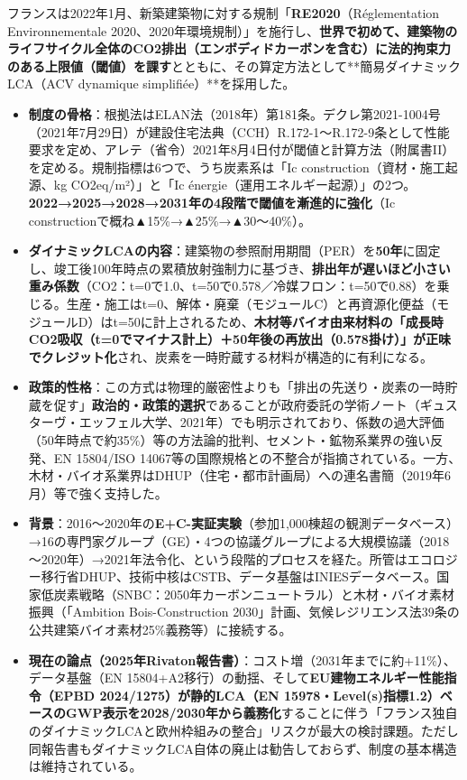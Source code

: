 \documentclass[11pt]{ltjsarticle}
\providecommand{\tightlist}{\setlength{\itemsep}{0pt}\setlength{\parskip}{0pt}}
\begin{document}
フランスは2022年1月、新築建築物に対する規制「\textbf{RE2020}（Réglementation
Environnementale
2020、2020年環境規制）」を施行し、\textbf{世界で初めて、建築物のライフサイクル全体のCO2排出（エンボディドカーボンを含む）に法的拘束力のある上限値（閾値）を課す}とともに、その算定方法として**簡易ダイナミックLCA（ACV
dynamique simplifiée）**を採用した。

\begin{itemize}
\tightlist
\item
  \textbf{制度の骨格}：根拠法はELAN法（2018年）第181条。デクレ第2021-1004号（2021年7月29日）が建設住宅法典（CCH）R.172-1～R.172-9条として性能要求を定め、アレテ（省令）2021年8月4日付が閾値と計算方法（附属書II）を定める。規制指標は6つで、うち炭素系は「Ic
  construction（資材・施工起源、kg CO2eq/m²）」と「Ic
  énergie（運用エネルギー起源）」の2つ。\textbf{2022→2025→2028→2031年の4段階で閾値を漸進的に強化}（Ic
  constructionで概ね▲15\%→▲25\%→▲30～40\%）。
\item
  \textbf{ダイナミックLCAの内容}：建築物の参照耐用期間（PER）を\textbf{50年}に固定し、竣工後100年時点の累積放射強制力に基づき、\textbf{排出年が遅いほど小さい重み係数}（CO2：t=0で1.0、t=50で0.578／冷媒フロン：t=50で0.88）を乗じる。生産・施工はt=0、解体・廃棄（モジュールC）と再資源化便益（モジュールD）はt=50に計上されるため、\textbf{木材等バイオ由来材料の「成長時CO2吸収（t=0でマイナス計上）＋50年後の再放出（0.578掛け）」が正味でクレジット化}され、炭素を一時貯蔵する材料が構造的に有利になる。
\item
  \textbf{政策的性格}：この方式は物理的厳密性よりも「排出の先送り・炭素の一時貯蔵を促す」\textbf{政治的・政策的選択}であることが政府委託の学術ノート（ギュスターヴ・エッフェル大学、2021年）でも明示されており、係数の過大評価（50年時点で約35\%）等の方法論的批判、セメント・鉱物系業界の強い反発、EN
  15804/ISO
  14067等の国際規格との不整合が指摘されている。一方、木材・バイオ系業界はDHUP（住宅・都市計画局）への連名書簡（2019年6月）等で強く支持した。
\item
  \textbf{背景}：2016～2020年の\textbf{E+C-実証実験}（参加1,000棟超の観測データベース）→16の専門家グループ（GE）・4つの協議グループによる大規模協議（2018～2020年）→2021年法令化、という段階的プロセスを経た。所管はエコロジー移行省DHUP、技術中核はCSTB、データ基盤はINIESデータベース。国家低炭素戦略（SNBC：2050年カーボンニュートラル）と木材・バイオ素材振興（「Ambition
  Bois-Construction
  2030」計画、気候レジリエンス法39条の公共建築バイオ素材25\%義務等）に接続する。
\item
  \textbf{現在の論点（2025年Rivaton報告書）}：コスト増（2031年までに約+11\%）、データ基盤（EN
  15804+A2移行）の動揺、そして\textbf{EU建物エネルギー性能指令（EPBD
  2024/1275）が静的LCA（EN
  15978・Level(s)指標1.2）ベースのGWP表示を2028/2030年から義務化}することに伴う「フランス独自のダイナミックLCAと欧州枠組みの整合」リスクが最大の検討課題。ただし同報告書もダイナミックLCA自体の廃止は勧告しておらず、制度の基本構造は維持されている。
\end{itemize}
\end{document}
